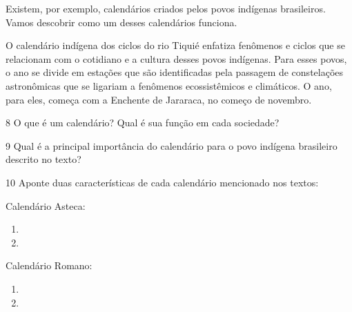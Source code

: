 \begin{itemize}
Existem, por exemplo, calendários criados pelos povos indígenas brasileiros. Vamos descobrir como um desses calendários funciona.

O calendário indígena dos ciclos do rio Tiquié enfatiza fenômenos e ciclos que se relacionam com o cotidiano e a cultura desses povos indígenas. Para esses povos, o ano se divide em estações que são identificadas pela passagem de constelações astronômicas que se ligariam a fenômenos ecossistêmicos e climáticos. O ano, para eles, começa com a Enchente de Jararaca, no começo de novembro.


\num{8} O que é um calendário? Qual é sua função em cada sociedade?


\num{9} Qual é a principal importância do calendário para o povo indígena brasileiro descrito no texto?


\num{10} Aponte duas características de cada calendário mencionado nos textos:

Calendário Asteca:

\begin{enumerate}
\item {}

\item {}
\end{enumerate}

Calendário Romano:

\begin{enumerate}
\item 

\item 
\end{enumerate}



\end{itemize}
